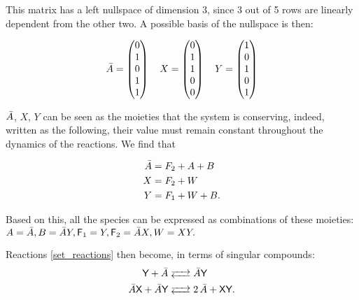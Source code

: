 \documentclass{article}
\newcommand{\ba}{\begin{eqnarray}}
\newcommand{\ea}{\end{eqnarray}}
\begin{document}
This matrix has a left nullspace of dimension 3, since 3 out of 5 rows are linearly dependent from the other two. A possible basis of the nullspace is then:

\begin{center}
    \begin{equation}
        \Bar{A}=\begin{pmatrix}
            0 \\
            1 \\
            0 \\
            1 \\
            1 \\           
\end{pmatrix} \quad
X=\begin{pmatrix}
            0 \\
            1 \\
            1 \\
            0 \\
            0 \\           
\end{pmatrix} \quad
Y=\begin{pmatrix}
            1 \\
            0 \\
            1 \\
            0 \\
            1 \\           
\end{pmatrix}
    \end{equation}
\end{center}

$\Bar{A}$, $X$, $Y$ can be seen as the moieties that the system is conserving, indeed, written as the following, their value must remain constant throughout the dynamics of the reactions. We find that
\begin{center}
\ba
\Bar{A} &= F_2 + A + B\\
X &= F_2 + W \nonumber \\
Y &= F_1 + W + B \nonumber.
\ea
\end{center}

Based on this, all the species can be expressed as combinations of these moieties:
$A = \Bar{A}, B = \Bar{A}Y, \textsf{F}_1  = Y,
\textsf{F}_2  = \Bar{A} X, W  = XY.$

Reactions \ref{set_reactions} then become, in terms of singular compounds:
\begin{equation}
		\begin{split}
		\ce{\textsf{Y} + \textsf{$\Bar{A}$}& <--> \textsf{$\Bar{A}$Y} } \\ 
\ce{$\Bar{A}$\textsf{X} + \textsf{$\Bar{A}$Y} & <--> 2 \textsf{$\Bar{A}$} + \textsf{XY}}.	
		\end{split} 
\end{equation}
\end{document}
